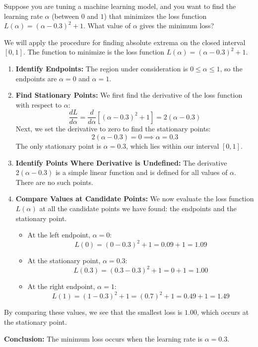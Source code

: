 \begin{example}

    Suppose you are tuning a machine learning model, and you want to find the learning rate \( \alpha \) (between \(0\) and \(1\)) that minimizes the loss function \( L(\alpha) = (\alpha - 0.3)^2 + 1 \). What value of \( \alpha \) gives the minimum loss?
    \end{example}
    
    \begin{solution} We will apply the procedure for finding absolute extrema on the closed interval \( [0, 1] \). The function to minimize is the loss function \( L(\alpha) = (\alpha - 0.3)^2 + 1 \).
    
    \begin{enumerate}
        \item \textbf{Identify Endpoints:} The region under consideration is \( 0 \le \alpha \le 1 \), so the endpoints are \( \alpha = 0 \) and \( \alpha = 1 \).
    
        \item \textbf{Find Stationary Points:} We first find the derivative of the loss function with respect to \( \alpha \):
        \[
        \frac{dL}{d\alpha} = \frac{d}{d\alpha} \left[ (\alpha - 0.3)^2 + 1 \right] = 2(\alpha - 0.3)
        \]
        Next, we set the derivative to zero to find the stationary points:
        \[
        2(\alpha - 0.3) = 0 \implies \alpha = 0.3
        \]
        The only stationary point is \( \alpha = 0.3 \), which lies within our interval \( [0, 1] \).
    
        \item \textbf{Identify Points Where Derivative is Undefined:} The derivative \( 2(\alpha - 0.3) \) is a simple linear function and is defined for all values of \( \alpha \). There are no such points.
    
        \item \textbf{Compare Values at Candidate Points:} We now evaluate the loss function \( L(\alpha) \) at all the candidate points we have found: the endpoints and the stationary point.
        \begin{itemize}
            \item At the left endpoint, \( \alpha = 0 \):
            \[ L(0) = (0 - 0.3)^2 + 1 = 0.09 + 1 = 1.09 \]
            \item At the stationary point, \( \alpha = 0.3 \):
            \[ L(0.3) = (0.3 - 0.3)^2 + 1 = 0 + 1 = 1.00 \]
            \item At the right endpoint, \( \alpha = 1 \):
            \[ L(1) = (1 - 0.3)^2 + 1 = (0.7)^2 + 1 = 0.49 + 1 = 1.49 \]
        \end{itemize}
    \end{enumerate}
    
    By comparing these values, we see that the smallest loss is \( 1.00 \), which occurs at the stationary point.
    
    \textbf{Conclusion:} The minimum loss occurs when the learning rate is \( \alpha = 0.3 \).
    \end{solution}

